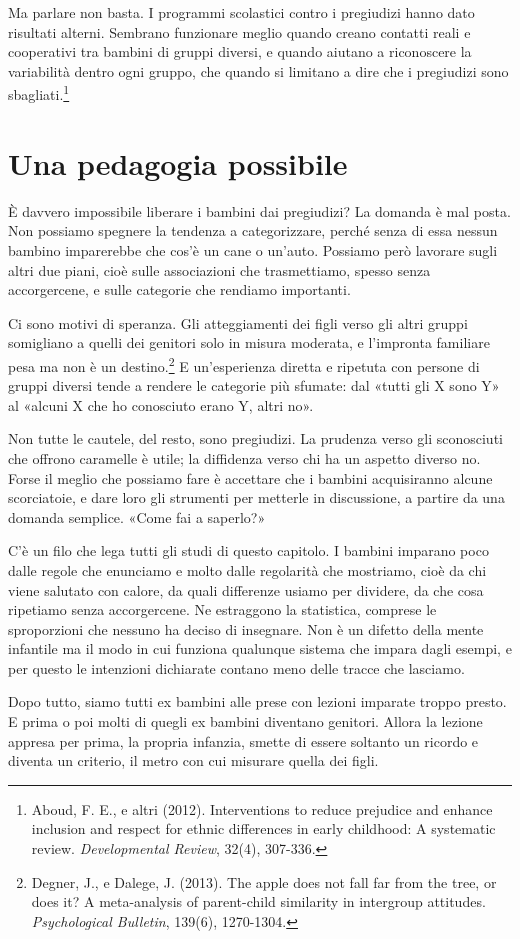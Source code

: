 Ma parlare non basta. I programmi scolastici contro i pregiudizi hanno dato risultati alterni. Sembrano funzionare meglio quando creano contatti reali e cooperativi tra bambini di gruppi diversi, e quando aiutano a riconoscere la variabilità dentro ogni gruppo, che quando si limitano a dire che i pregiudizi sono sbagliati.\footnote{Aboud, F. E., e altri (2012). Interventions to reduce prejudice and enhance inclusion and respect for ethnic differences in early childhood: A systematic review. \textit{Developmental Review}, 32(4), 307-336.}

\section{Una pedagogia possibile}

È davvero impossibile liberare i bambini dai pregiudizi? La domanda è mal posta. Non possiamo spegnere la tendenza a categorizzare, perché senza di essa nessun bambino imparerebbe che cos'è un cane o un'auto. Possiamo però lavorare sugli altri due piani, cioè sulle associazioni che trasmettiamo, spesso senza accorgercene, e sulle categorie che rendiamo importanti.

Ci sono motivi di speranza. Gli atteggiamenti dei figli verso gli altri gruppi somigliano a quelli dei genitori solo in misura moderata, e l'impronta familiare pesa ma non è un destino.\footnote{Degner, J., e Dalege, J. (2013). The apple does not fall far from the tree, or does it? A meta-analysis of parent-child similarity in intergroup attitudes. \textit{Psychological Bulletin}, 139(6), 1270-1304.} E un'esperienza diretta e ripetuta con persone di gruppi diversi tende a rendere le categorie più sfumate: dal «tutti gli X sono Y» al «alcuni X che ho conosciuto erano Y, altri no».

Non tutte le cautele, del resto, sono pregiudizi. La prudenza verso gli sconosciuti che offrono caramelle è utile; la diffidenza verso chi ha un aspetto diverso no. Forse il meglio che possiamo fare è accettare che i bambini acquisiranno alcune scorciatoie, e dare loro gli strumenti per metterle in discussione, a partire da una domanda semplice. «Come fai a saperlo?»

C'è un filo che lega tutti gli studi di questo capitolo. I bambini imparano poco dalle regole che enunciamo e molto dalle regolarità che mostriamo, cioè da chi viene salutato con calore, da quali differenze usiamo per dividere, da che cosa ripetiamo senza accorgercene. Ne estraggono la statistica, comprese le sproporzioni che nessuno ha deciso di insegnare. Non è un difetto della mente infantile ma il modo in cui funziona qualunque sistema che impara dagli esempi, e per questo le intenzioni dichiarate contano meno delle tracce che lasciamo.

Dopo tutto, siamo tutti ex bambini alle prese con lezioni imparate troppo presto. E prima o poi molti di quegli ex bambini diventano genitori. Allora la lezione appresa per prima, la propria infanzia, smette di essere soltanto un ricordo e diventa un criterio, il metro con cui misurare quella dei figli.
